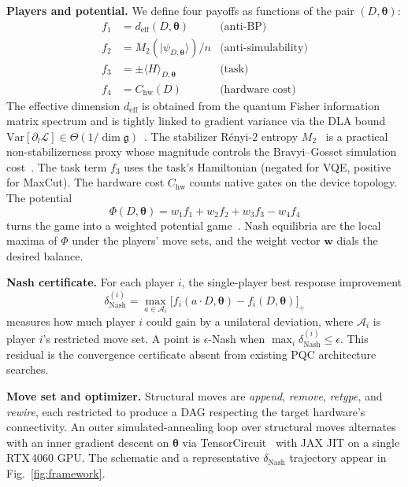 \documentclass[prl,twocolumn,aps,superscriptaddress,showkeys,floatfix,nofootinbib]{revtex4-2}
\begin{document}
\textbf{Players and potential.} We define four payoffs as functions of the pair $(D,\bm\theta)$:
\begin{align*}
f_1 &= d_\text{eff}(D,\bm\theta) & \text{(anti-BP)}\\
f_2 &= M_2(|\psi_{D,\bm\theta}\rangle)/n & \text{(anti-simulability)}\\
f_3 &= \pm\langle H\rangle_{D,\bm\theta} & \text{(task)}\\
f_4 &= C_\text{hw}(D) & \text{(hardware cost)}
\end{align*}
The effective dimension $d_\text{eff}$ is obtained from the quantum Fisher information matrix spectrum and is tightly linked to gradient variance via the DLA bound $\mathrm{Var}[\partial_l\mathcal L]\in\Theta(1/\dim\mathfrak g)$~\cite{ragone2024lie}. The stabilizer R\'enyi-$2$ entropy $M_2$~\cite{leone2022stabilizer} is a practical non-stabilizerness proxy whose magnitude controls the Bravyi--Gosset simulation cost~\cite{bravyi2016trading}. The task term $f_3$ uses the task's Hamiltonian (negated for VQE, positive for MaxCut). The hardware cost $C_\text{hw}$ counts native gates on the device topology. The potential
\begin{equation}
\Phi(D,\bm\theta)=w_1 f_1+w_2 f_2+w_3 f_3 - w_4 f_4
\label{eq:potential}
\end{equation}
turns the game into a weighted potential game~\cite{monderer1996potential}. Nash equilibria are the local maxima of $\Phi$ under the players' move sets, and the weight vector $\bm w$ dials the desired balance.

\textbf{Nash certificate.} For each player $i$, the single-player best response improvement
\begin{equation}
\delta^{(i)}_\text{Nash}=\max_{a\in\mathcal A_i}\bigl[f_i(a\cdot D,\bm\theta)-f_i(D,\bm\theta)\bigr]_+
\label{eq:delta}
\end{equation}
measures how much player $i$ could gain by a unilateral deviation, where $\mathcal A_i$ is player $i$'s restricted move set. A point is $\epsilon$-Nash when $\max_i \delta^{(i)}_\text{Nash}\le\epsilon$. This residual is the convergence certificate absent from existing PQC architecture searches.

\textbf{Move set and optimizer.} Structural moves are \emph{append}, \emph{remove}, \emph{retype}, and \emph{rewire}, each restricted to produce a DAG respecting the target hardware's connectivity. An outer simulated-annealing loop over structural moves alternates with an inner gradient descent on $\bm\theta$ via TensorCircuit~\cite{zhang2023tensorcircuit} with JAX JIT on a single RTX\,4060 GPU. The schematic and a representative $\delta_\text{Nash}$ trajectory appear in Fig.~\ref{fig:framework}.
\end{document}
